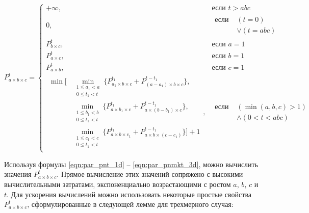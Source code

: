 \begin{equation}\label{eqn:par_pnmkt_3d}
P_{a \times b \times c}^t =
	\begin{cases}
		+\infty, & \text{если } t > abc \\
		0, & 
			\begin{aligned}
				\text{если } & (t = 0) \\[-10pt]
				& \vee (t = abc)
			\end{aligned} \\
		P_{b \times c}^t, & \text{если } a = 1 \\
		P_{a \times c}^t, & \text{если } b = 1 \\
		P_{a \times b}^t, & \text{если } c = 1 \\
		\begin{aligned}
			\min\big[
				& \min_{\substack{1 \le a_1 < a \\ 0 \le t_1 < t}}{\{P_{a_1 \times b \times c}^{t_1} + P_{(a - a_1) \times b \times c}^{t - t_1}\}}, \\[-8pt]
				& \min_{\substack{1 \le b_1 < b \\ 0 \le t_1 < t}}{\{P_{a \times b_1 \times c}^{t_1} + P_{a \times (b - b_1) \times c}^{t - t_1}\}}, \\[-8pt]
				& \min_{\substack{1 \le c_1 < c \\ 0 \le t_1 < t}}{\{P_{a \times b \times c_1}^{t_1} + P_{a \times b \times (c - c_1)}^{t - t_1}\}}
			\big] + 1
		\end{aligned}, & 
			\begin{aligned}
				\text{если } & (\min(a, b, c) > 1) \\[-10pt]
				& \wedge (0 < t < abc)
			\end{aligned}
	\end{cases}
\end{equation}

Используя формулы \eqref{eqn:par_pnt_1d} -- \eqref{eqn:par_pnmkt_3d}, можно вычислить значения $P_{a \times b \times c}^t$.
Прямое вычисление этих значений сопряжено с высокими вычислительными затратами, экспоненциально возрастающими с ростом $a$, $b$, $c$ и $t$.
Для ускорения вычислений можно использовать некоторые простые свойства $P_{a \times b \times c}^t$, сформулированные в следующей лемме для трехмерного случая:

